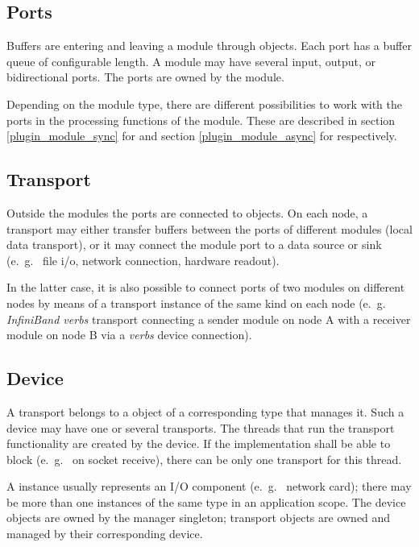       
\subsection{Ports}
Buffers are entering and leaving a module through 
  objects. 
Each port has a buffer queue of configurable length.
A module may have several input, output,  
or bidirectional ports. The ports are owned by the module.

Depending on the module type, there are different possibilities to
work with the ports in the processing functions of the module.
These are described in section \ref{plugin_module_sync} for 
and section \ref{plugin_module_async} for  respectively.
 



\subsection{Transport}
Outside the modules the ports are connected to 
  objects.
On each node, a transport may either transfer buffers between 
the ports of different modules (local data transport), or it may connect the module port to a data 
source or sink (e.~g.~ file i/o, network connection, hardware readout).

In the latter case, it is also possible  to connect ports of two modules on 
different nodes by means of a transport instance of the same kind on 
each node (e.~g.~ {\em InfiniBand verbs} transport connecting a sender module on node A with a receiver
module on node B via a {\em verbs} device connection).


\subsection{Device}
A transport belongs to a  
 object of a 
corresponding type that manages it. Such a device may have one or several transports.  
The threads that run the transport functionality are
created by the device. If the  implementation 
shall be able to block (e.~g.~ on socket receive), there can be only 
one transport for this thread. 

A  instance usually represents an I/O component (e.~g.~ network card); 
there may be more than one  instances of the same 
type in an application scope. 
The device objects are owned by the manager 
singleton; transport objects are owned and managed by their corresponding device.  

